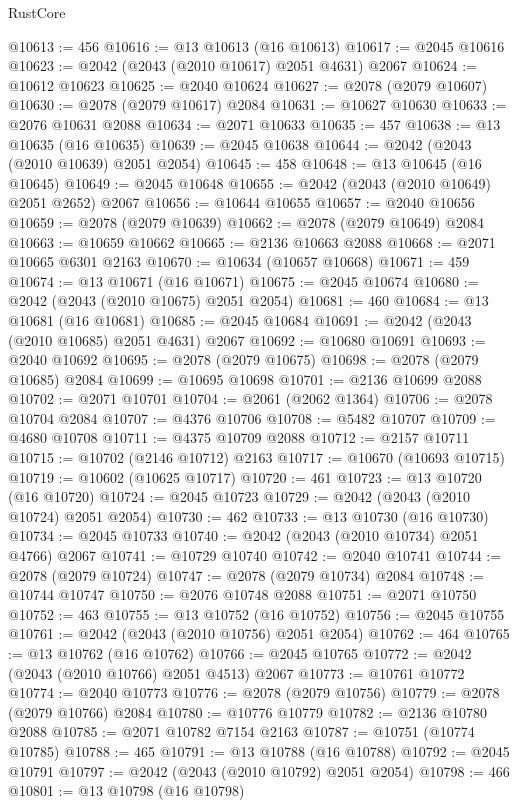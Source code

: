 \begin{lexlean}{RustCore}
\begin{coremodule}
@10613 := 456
@10616 := @13 @10613 (@16 @10613)
@10617 := @2045 @10616
@10623 := @2042 (@2043 (@2010 @10617) @2051 @4631) @2067
@10624 := @10612 @10623
@10625 := @2040 @10624
@10627 := @2078 (@2079 @10607)
@10630 := @2078 (@2079 @10617) @2084
@10631 := @10627 @10630
@10633 := @2076 @10631 @2088
@10634 := @2071 @10633
@10635 := 457
@10638 := @13 @10635 (@16 @10635)
@10639 := @2045 @10638
@10644 := @2042 (@2043 (@2010 @10639) @2051 @2054)
@10645 := 458
@10648 := @13 @10645 (@16 @10645)
@10649 := @2045 @10648
@10655 := @2042 (@2043 (@2010 @10649) @2051 @2652) @2067
@10656 := @10644 @10655
@10657 := @2040 @10656
@10659 := @2078 (@2079 @10639)
@10662 := @2078 (@2079 @10649) @2084
@10663 := @10659 @10662
@10665 := @2136 @10663 @2088
@10668 := @2071 @10665 @6301 @2163
@10670 := @10634 (@10657 @10668)
@10671 := 459
@10674 := @13 @10671 (@16 @10671)
@10675 := @2045 @10674
@10680 := @2042 (@2043 (@2010 @10675) @2051 @2054)
@10681 := 460
@10684 := @13 @10681 (@16 @10681)
@10685 := @2045 @10684
@10691 := @2042 (@2043 (@2010 @10685) @2051 @4631) @2067
@10692 := @10680 @10691
@10693 := @2040 @10692
@10695 := @2078 (@2079 @10675)
@10698 := @2078 (@2079 @10685) @2084
@10699 := @10695 @10698
@10701 := @2136 @10699 @2088
@10702 := @2071 @10701
@10704 := @2061 (@2062 @1364)
@10706 := @2078 @10704 @2084
@10707 := @4376 @10706
@10708 := @5482 @10707
@10709 := @4680 @10708
@10711 := @4375 @10709 @2088
@10712 := @2157 @10711
@10715 := @10702 (@2146 @10712) @2163
@10717 := @10670 (@10693 @10715)
@10719 := @10602 (@10625 @10717)
@10720 := 461
@10723 := @13 @10720 (@16 @10720)
@10724 := @2045 @10723
@10729 := @2042 (@2043 (@2010 @10724) @2051 @2054)
@10730 := 462
@10733 := @13 @10730 (@16 @10730)
@10734 := @2045 @10733
@10740 := @2042 (@2043 (@2010 @10734) @2051 @4766) @2067
@10741 := @10729 @10740
@10742 := @2040 @10741
@10744 := @2078 (@2079 @10724)
@10747 := @2078 (@2079 @10734) @2084
@10748 := @10744 @10747
@10750 := @2076 @10748 @2088
@10751 := @2071 @10750
@10752 := 463
@10755 := @13 @10752 (@16 @10752)
@10756 := @2045 @10755
@10761 := @2042 (@2043 (@2010 @10756) @2051 @2054)
@10762 := 464
@10765 := @13 @10762 (@16 @10762)
@10766 := @2045 @10765
@10772 := @2042 (@2043 (@2010 @10766) @2051 @4513) @2067
@10773 := @10761 @10772
@10774 := @2040 @10773
@10776 := @2078 (@2079 @10756)
@10779 := @2078 (@2079 @10766) @2084
@10780 := @10776 @10779
@10782 := @2136 @10780 @2088
@10785 := @2071 @10782 @7154 @2163
@10787 := @10751 (@10774 @10785)
@10788 := 465
@10791 := @13 @10788 (@16 @10788)
@10792 := @2045 @10791
@10797 := @2042 (@2043 (@2010 @10792) @2051 @2054)
@10798 := 466
@10801 := @13 @10798 (@16 @10798)

\end{coremodule}
\end{lexlean}
